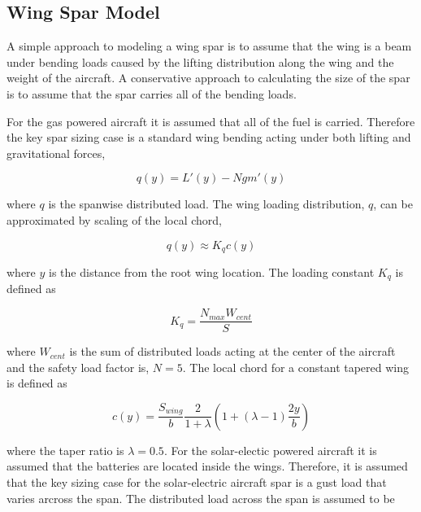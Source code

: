 \documentclass[]{aiaa-tc}%
\begin{document}
\subsection{Wing Spar Model}

A simple approach to modeling a wing spar is to assume that the wing is a beam under bending loads caused by the lifting distribution along the wing and the weight of the aircraft. 
A conservative approach to calculating the size of the spar is to assume that the spar carries all of the bending loads.  

For the gas powered aircraft it is assumed that all of the fuel is carried. 
Therefore the key spar sizing case is a standard wing bending acting under both lifting and gravitational forces, 

\begin{equation}
    \label{e:wloading}
    q(y) = L'(y) - Ngm'(y)
\end{equation}

where $q$ is the spanwise distributed load. 
The wing loading distribution, $q$, can be approximated by scaling of the local chord,\cite{bending}

\begin{equation}
    \label{e:wingloading}
    q(y) \approx K_q c(y) 
\end{equation}

where $y$ is the distance from the root wing location. The loading constant $K_q$\cite{bending} is defined as

\begin{equation}
    \label{e:kq}
    K_q = \frac{N_{max}W_{cent}}{S}
\end{equation}

where $W_{cent}$ is the sum of distributed loads acting at the center of the aircraft and the safety load factor is, $N=5$. The local chord for a constant tapered wing\cite{bending} is defined as 

\begin{equation}
    \label{e:localchord}
    c(y) = \frac{S_{wing}}{b} \frac{2}{1+\lambda} \left( 1 + (\lambda - 1) \frac{2y}{b} \right)
\end{equation}

where the taper ratio is $\lambda=0.5$. 
For the solar-electic powered aircraft it is assumed that the batteries are located inside the wings.  
Therefore, it is assumed that the key sizing case for the solar-electric aircraft spar is a gust load that varies arcross the span.  
The distributed load across the span is assumed to be 
\end{document}
